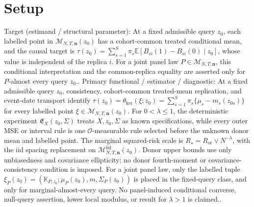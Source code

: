 \documentclass{article}
\begin{document}
\section{Setup}

Target (estimand / structural parameter): At a fixed admissible query \(z_0\), each labelled point in \(\mathcal M_{N,T,\mathbf n}(z_0)\) has a cohort-common treated conditional mean, and the causal target is \(\tau(z_0)=\sum_{s=1}^{S}\pi_s\mathbb E[B_{si}(1)-B_{si}(0)\mid z_0]\), whose value is independent of the replica \(i\). For a joint panel law \(P\in\mathcal M_{N,T,\mathbf n}\), this conditional interpretation and the common-replica equality are asserted only for \(P\)-almost every query \(z_0\)..
Primary functional / estimator / diagnostic: At a fixed admissible query \(z_0\), consistency, cohort-common treated-mean replication, and event-date transport identify \(\tau(z_0)=\theta_{\mathrm{ker}}(\xi;z_0)=\sum_{s=1}^{S}\pi_s\{\mu_s-m_s(z_{0s})\}\) for every labelled point \(\xi\in\mathcal M_{N,T,\mathbf n}(z_0)\). For \(0<\lambda\le1\), the deterministic experiment \(\mathfrak E_X(z_0,\Sigma)\) treats \(X,z_0,\Sigma\) as known specifications, while every outer MSE or interval rule is one \(\mathcal O\)-measurable rule selected before the unknown donor mean and labelled point. The marginal squared-risk scale is \(R_\star=R_{\mathrm{or}}\vee N^{-\lambda}\), with the iid spacing replacement on \(\mathcal M^{\mathrm{iid}}_{N,T,\mathbf n}(z_0)\). Donor upper bounds use only unbiasedness and covariance ellipticity; no donor fourth-moment or covariance-consistency condition is imposed. For a joint panel law, only the labelled tuple \(\xi_P(z_0)=(\mathbb K_{P,z_0};\mu_P(z_0),m,\Sigma_P(z_0))\) is placed in the fixed-query class, and only for marginal-almost-every query. No panel-induced conditional converse, null-query assertion, lower local modulus, or result for \(\lambda>1\) is claimed..
\end{document}

